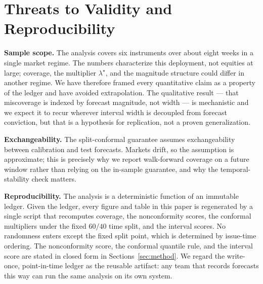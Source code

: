 \documentclass[11pt,a4paper]{article}
\begin{document}
\section{Threats to Validity and Reproducibility}\label{sec:threats}
\textbf{Sample scope.} The analysis covers six instruments over about eight weeks in a
single market regime. The numbers characterize this deployment, not equities at large;
coverage, the multiplier $\lambda^\star$, and the magnitude structure could differ in
another regime. We have therefore framed every quantitative claim as a property of the
ledger and have avoided extrapolation. The qualitative result --- that miscoverage is
indexed by forecast magnitude, not width --- is mechanistic and we expect it to recur
wherever interval width is decoupled from forecast conviction, but that is a
hypothesis for replication, not a proven generalization.

\textbf{Exchangeability.} The split-conformal guarantee assumes exchangeability
between calibration and test forecasts. Markets drift, so the assumption is
approximate; this is precisely why we report walk-forward coverage on a future window
rather than relying on the in-sample guarantee, and why the temporal-stability check
matters.

\textbf{Reproducibility.} The analysis is a deterministic function of an immutable
ledger. Given the ledger, every figure and table in this paper is regenerated by a
single script that recomputes coverage, the nonconformity scores, the conformal
multipliers under the fixed $60/40$ time split, and the interval scores. No randomness
enters except the fixed split point, which is determined by issue-time ordering. The
nonconformity score, the conformal quantile rule, and the interval score are stated in
closed form in Sections~\ref{sec:method}. We regard the write-once, point-in-time
ledger as the reusable artifact: any team that records forecasts this way can run the
same analysis on its own system.

\end{document}
